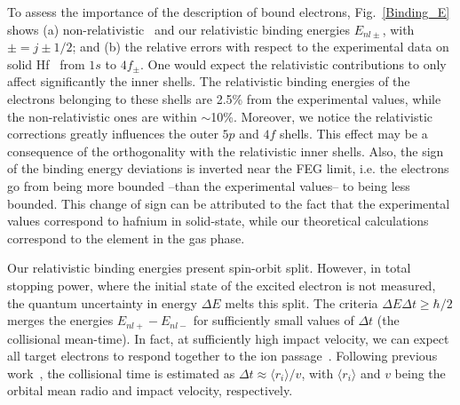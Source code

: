 \documentclass[aps,pra,reprint,groupedaddress,showpacs,showkeys]{revtex4-1}
\begin{document}
To assess the importance of the description of bound electrons, 
Fig.~\ref{Binding_E} shows (a) non-relativistic~\cite{badnell97} and 
our relativistic binding energies $E_{nl\pm}$, with $\pm=j\pm1/2$; and 
(b) the relative errors with respect to the experimental data on solid 
Hf~\cite{williams1995} from $1s$ to $4f_{\pm}$. 
One would expect the relativistic contributions to only affect 
significantly the inner shells. The relativistic binding energies of the 
electrons belonging to these shells are 2.5\% from the experimental values,
while the non-relativistic ones are within $\sim$10\%. Moreover, we notice 
the relativistic corrections greatly influences the outer $5p$ and $4f$ 
shells. This effect may be a consequence of the orthogonality with the 
relativistic inner shells. Also, the sign of the binding energy deviations 
is inverted near the FEG limit, i.e. the electrons go from being more 
bounded --than the experimental values-- to being less bounded. 
This change of sign can be attributed to the fact that the experimental 
values correspond to hafnium in solid-state, while our theoretical 
calculations correspond to the element in the gas phase.

Our relativistic binding energies present spin-orbit split. However, in 
total stopping power, where the initial state of the excited electron is 
not measured, the quantum uncertainty in energy $\Delta E$ melts this 
split. The criteria $\Delta E\Delta t\geq\hbar/2$ merges the energies 
$E_{nl+}-E_{nl-}$ for sufficiently small values of $\Delta t$ (the 
collisional mean-time). In fact, at sufficiently high impact velocity, 
we can expect all target electrons to respond together to the ion 
passage~\cite{lindhard53,chu72}. Following previous work~\cite{mon09}, 
the collisional time is estimated as $\Delta t\approx\langle r_i\rangle/v$, 
with $\langle r_i\rangle$ and $v$ being the orbital mean radio and 
impact velocity, respectively. 
\end{document}

